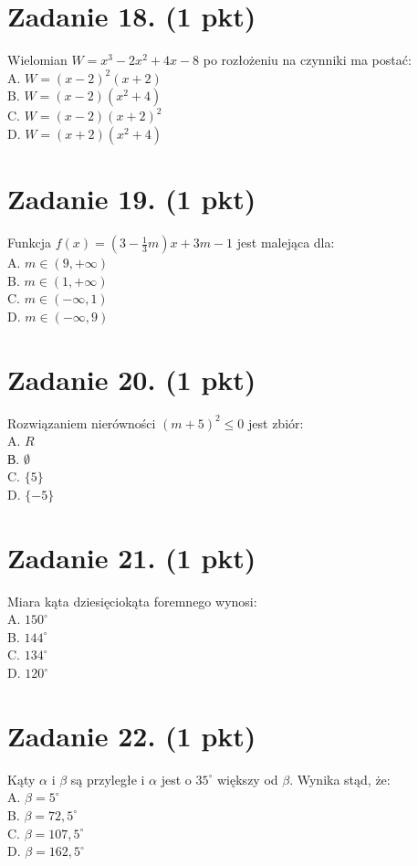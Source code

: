 \documentclass[10pt]{article}
\begin{document}
\section*{Zadanie 18. (1 pkt)}
Wielomian \(W=x^{3}-2 x^{2}+4 x-8\) po rozłożeniu na czynniki ma postać:\\
A. \(W=(x-2)^{2}(x+2)\)\\
B. \(W=(x-2)\left(x^{2}+4\right)\)\\
C. \(W=(x-2)(x+2)^{2}\)\\
D. \(W=(x+2)\left(x^{2}+4\right)\)

\section*{Zadanie 19. (1 pkt)}
Funkcja \(f(x)=\left(3-\frac{1}{3} m\right) x+3 m-1\) jest malejąca dla:\\
A. \(m \in(9,+\infty)\)\\
B. \(m \in(1,+\infty)\)\\
C. \(m \in(-\infty, 1)\)\\
D. \(m \in(-\infty, 9)\)

\section*{Zadanie 20. (1 pkt)}
Rozwiązaniem nierówności \((m+5)^{2} \leq 0\) jest zbiór:\\
A. \(R\)\\
В. \(\emptyset\)\\
C. \(\{5\}\)\\
D. \(\{-5\}\)

\section*{Zadanie 21. (1 pkt)}
Miara kąta dziesięciokąta foremnego wynosi:\\
A. \(150^{\circ}\)\\
B. \(144^{\circ}\)\\
C. \(134^{\circ}\)\\
D. \(120^{\circ}\)

\section*{Zadanie 22. (1 pkt)}
Kąty \(\alpha\) i \(\beta\) są przyległe i \(\alpha\) jest o \(35^{\circ}\) większy od \(\beta\). Wynika stąd, że:\\
A. \(\beta=5^{\circ}\)\\
B. \(\beta=72,5^{\circ}\)\\
C. \(\beta=107,5^{\circ}\)\\
D. \(\beta=162,5^{\circ}\)
\end{document}
